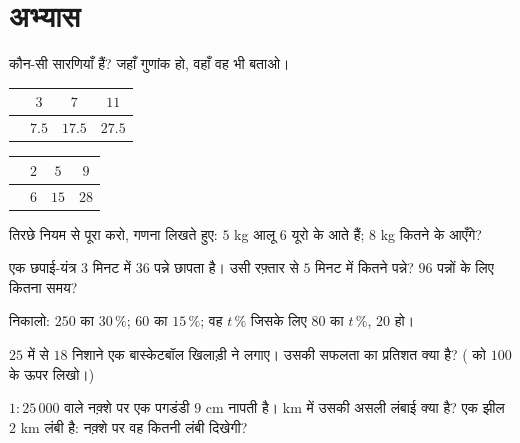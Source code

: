\section{अभ्यास}

\begin{exercise}[$\star$]\label{exo:g7:prop:1}
कौन-सी सारणियाँ  हैं? जहाँ गुणांक हो, वहाँ वह भी
बताओ।
\begin{center}
\renewcommand{\arraystretch}{1.2}
\begin{tabular}{l|ccc}
 & $3$ & $7$ & $11$ \\
\hline
 & $7.5$ & $17.5$ & $27.5$ \\
\end{tabular}
\qquad
\begin{tabular}{l|ccc}
 & $2$ & $5$ & $9$ \\
\hline
 & $6$ & $15$ & $28$ \\
\end{tabular}
\end{center}
\end{exercise}

\begin{exercise}[$\star$]\label{exo:g7:prop:2}
तिरछे नियम से पूरा करो, गणना लिखते हुए: $5$ kg आलू $6$ यूरो के
आते हैं; $8$ kg कितने के आएँगे?
\end{exercise}

\begin{exercise}[$\star$]\label{exo:g7:prop:3}
एक छपाई-यंत्र $3$ मिनट में $36$ पन्ने छापता है। उसी रफ़्तार से $5$
मिनट में कितने पन्ने? $96$ पन्नों के लिए कितना समय?
\end{exercise}

\begin{exercise}[$\star$]\label{exo:g7:prop:4}
निकालो: $250$ का $30\,\%$; \quad $60$ का $15\,\%$; \quad वह
$t\,\%$ जिसके लिए $80$ का $t\,\%$, $20$ हो।
\end{exercise}

\begin{exercise}[$\star$]\label{exo:g7:prop:5}
$25$ में से $18$ निशाने एक बास्केटबॉल खिलाड़ी ने लगाए। उसकी सफलता
का प्रतिशत क्या है? ( को $100$ के ऊपर लिखो।)
\end{exercise}

\begin{exercise}[$\star$]\label{exo:g7:prop:6}
$1 : 25\,000$  वाले नक़्शे पर एक पगडंडी $9$ cm नापती है। km में
उसकी असली लंबाई क्या है? एक झील $2$ km लंबी है: नक़्शे पर वह कितनी
लंबी दिखेगी?
\end{exercise}

